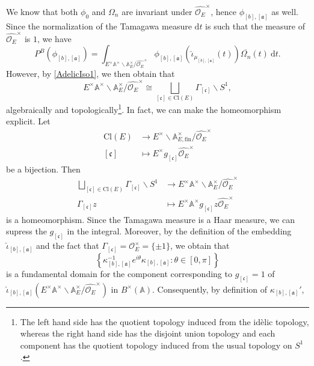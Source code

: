 \documentclass[11pt]{amsart}
\newcommand{\bigo}{\mathcal{O}}
\newcommand{\A}{\mathbb{A}}
\renewcommand{\a}{\mathfrak{a}}
\theoremstyle{definition}
\theoremstyle{remark}
\begin{document}
We know that both $\phi_0$ and $\Omega_n$ are invariant under $\widehat{\bigo_E}^{\times}$, hence $\phi_{[b], [\a]}$ as well. Since the normalization of the Tamagawa measure $\mathrm{d}t$ is such that the measure of $\widehat{\bigo_E}^{\times}$ is $1$, we have $$ P^B(\phi_{[b], [\a]}) = \int_{E^{\times} \A^{\times} \backslash \A_{E}^{\times} / \widehat{\bigo_E}^{\times}} \phi_{[b], [\a]}(\widehat{\iota}_{\mu_{[b],[\a]}}(t)) \overline{\Omega_{n}}(t) \: \mathrm{d}t.$$ However, by \eqref{AdelicIso1}, we then obtain that $$ E^{\times} \A^{\times} \backslash \A_{E}^{\times} / \widehat{\bigo_E}^{\times} \cong \bigsqcup_{[\mathfrak{c}] \in \mathrm{Cl}(E)} \Gamma_{[\mathfrak{c}]} \backslash S^1,$$ algebraically and topologically\footnote{The left hand side has the quotient topology induced from the idèlic topology, whereas the right hand side has the disjoint union topology and each component has the quotient topology induced from the usual topology on $S^1$.}. 
In fact, we can make the homeomorphism explicit. Let
\begin{align*}
    \mathrm{Cl}(E) &\longrightarrow E^{\times} \backslash \A_{E,\text{fin}}^{\times} / \widehat{\bigo_E}^{\times} \\
    [\mathfrak{c}] &\longmapsto E^{\times} g_{[\mathfrak{c}]} \widehat{\bigo_{E}}^{\times}
\end{align*}
be a bijection. Then
\begin{align*}
    \bigsqcup_{[\mathfrak{c}] \in \mathrm{Cl}(E)} \Gamma_{[\mathfrak{c}]} \backslash S^1 &\longrightarrow E^{\times} \A^{\times} \backslash \A_{E}^{\times} / \widehat{\bigo_E}^{\times} \\
    \Gamma_{[\mathfrak{c}]} z &\longmapsto E^{\times} \A^{\times} g_{[\mathfrak{c}]} z \widehat{\bigo_E}^{\times}
\end{align*}
is a homeomorphism. Since the Tamagawa measure is a Haar measure, we can supress the $g_{[\mathfrak{c}]}$ in the integral. Moreover, by the definition of the embedding $\widehat{\iota}_{[b],[\a]}$ and the fact that $\Gamma_{[\mathfrak{c}]}=\bigo_{E}^{\times} = \{\pm 1\}$, we obtain that $$ \left\{ \kappa_{[b],[\a]}^{-1} e^{i\theta} \kappa_{[b],[\a]} : \theta \in [0,\pi] \right\}$$ is a fundamental domain for the component corresponding to $g_{[\mathfrak{c}]}=1$ of $\widehat{\iota}_{[b],[\a]}\left(E^{\times} \A^{\times} \backslash \A_{E}^{\times} / \widehat{\bigo_E}^{\times}\right)$ in $B^{\times}(\A)$. Consequently, by definition of $\kappa_{[b],[\a]}'$,
\end{document}
